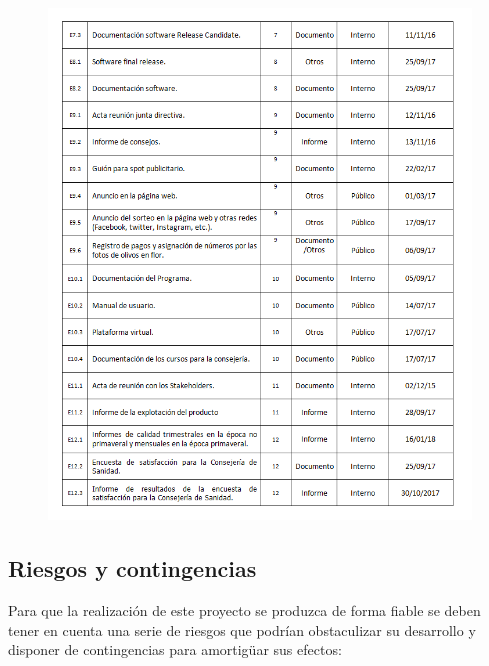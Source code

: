 \documentclass[12pt,oneside,a4paper]{article}
\numberwithin{figure}{section}
\begin{document}
\begin{figure}[H]
\begin{center}
\includegraphics[scale=0.8]{Entregablesp3.png}
\end{center}
\end{figure}
\clearpage

\subsection{Riesgos y contingencias}

Para que la realización de este proyecto se produzca de forma fiable se deben tener en cuenta una serie de riesgos que podrían obstaculizar su desarrollo y disponer de contingencias para amortigüar sus efectos:
\end{document}

